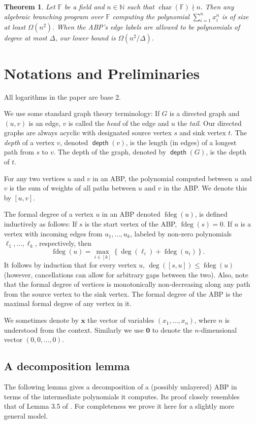 \documentclass[10pt,a4paper]{article}
\newtheorem{theorem}{Theorem}
\newcommand{\F}{\mathbb F}
\newcommand{\N}{\mathbb N}
\newcommand{\vx}{\mathbf x}
\DeclareMathOperator{\fdeg}{fdeg}
\DeclareMathOperator{\Char}{char}
\DeclareMathOperator{\depth}{\mathsf{depth}}
\newcommand{\set}[1]{\left\{#1\right\}}
\begin{document}
\begin{theorem}\label{thm:intro main}
Let $\F$ be a field and $n\in\N$ such that $\Char(\F)\nmid n$. Then any algebraic branching program over $\F$ computing the polynomial $\sum_{i=1}^n x_i^n$ is of size at least $\Omega(n^2)$.
When the ABP's edge labels are allowed to be polynomials of degree at most $\Delta$, our lower bound is $\Omega(n^2/\Delta)$.
\end{theorem}

\setcounter{section}{1}
\setcounter{theorem}{3}
\section{Notations and Preliminaries}
All logarithms in the paper are base 2.

We use some standard graph theory terminology: If $G$ is a directed graph and $(u,v)$ is an edge, $v$ is called the \emph{head} of the edge and $u$ the \emph{tail}. Our directed graphs are always acyclic with designated source vertex $s$ and sink vertex $t$. The \emph{depth} of a vertex $v$, denoted $\depth(v)$, is the length (in edges) of a longest path from $s$ to $v$. The depth of the graph, denoted by $\depth(G)$, is the depth of $t$.

For any two vertices $u$ and $v$ in an ABP, the polynomial computed between $u$ and $v$ is the sum of weights of all paths between $u$ and $v$  in the ABP. We denote this by $[u,v]$. 

The formal degree of a vertex $u$ in an ABP denoted $\fdeg(u)$, is defined inductively as follows: If $s$ is the start vertex of the ABP, $\fdeg(s)=0$. If $u$ is a vertex with incoming edges from $u_1, \ldots, u_k$, labeled by non-zero polynomials $\ell_1, \ldots, \ell_k$, respectively, then
\[
\fdeg(u) = \max_{i \in [k]} \set{ \deg(\ell_i) + \fdeg(u_i) }.
\]
It follows by induction that for every vertex $u$, $\deg ([s,u]) \le \fdeg(u)$ (however, cancellations can allow for arbitrary gaps between the two). Also, note that the formal degree of vertices is monotonically non-decreasing along any path from the source vertex to the sink vertex. The formal degree of the ABP is the maximal formal degree of any vertex in it.

We sometimes denote by $\vx$ the vector of variables $(x_1, \ldots, x_n)$, where $n$ is understood from the context. Similarly we use $\mathbf{0}$ to denote the $n$-dimensional vector $(0,0,\ldots,0)$.

	

\subsection{A decomposition lemma}
The following lemma gives a decomposition of a (possibly unlayered) ABP in terms of the intermediate polynomials it computes. Its proof closely resembles that of Lemma 3.5 of \cite{K19}. For completeness we prove it here for a slightly more general model.
\end{document}
